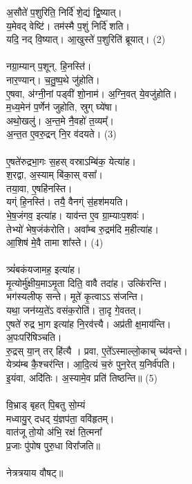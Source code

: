 अ॒सौते॑ प॒शुरिति॒ निर्दि॑ शे॒द्यं द्वि॒ष्यात्। \\
य॒मेवद् वेष्टि॑। तम॑स्मै प॒शुं निर्दि॑ शति। \\
यदि॒ नद् वि॒ष्यात्। आ॒खुस्ते॑ प॒शुरिति॑ ब्रूयात्। (2)\\
\\
नग्रा॒म्यान् प॒शून्, हि॒नस्ति॑। \\
नार॒ण्यान्। च॒तु॒ष्प॒थे जु॑होति।\\
ए॒षवा, अ॑ग्नी॒नां पड्वी॑ शो॒नाम॑। अ॒ग्नि॒वत् ये॒वजु॑होति। \\
म॒ध्य॒मेन॑ प॒र्णेन॑ जुहोति, स्रुग् घ्ये॑षा। \\
अथो॒खलु॑। अ॒न्त॒मे नै॒वहो॑ त॒व्यम्‌᳚। \\
अ॒न्त॒त ए॒वरु॒द्रन् नि॒र व॑दयते। (3)\\
\\
ए॒षते॑रुद्रभा॒गः स॒हस् वस्राऽम्बि॑क॒ येत्या॑ह। \\
श॒रद्वा, अ॒स्याम् बि॑का॒स् वसा᳚। \\
तया॒वा, ए॒षहि॑नस्ति।\\
यग्ं हि॒नस्ति॑। तयै॒ वैनग्ं स॒॑हश॑मयति। \\
भे॒ष॒जंगव॒ इत्या॑ह। याव॑न्त ए॒व ग्रा॒म्याःप॒शवः॑।\\
तेभ्यो॑ भेष॒जंक॑रोति। अवा᳚म्ब रु॒द्रम॑दि म॒हीत्या॑ह। \\
आ॒शिष॑ मे॒वै तामा शा᳚स्ते। (4)\\
\\
त्र्यं॑बकंयजामह॒ इत्या॑ह। \\
मृ॒त्योर्मु॑क्षीय॒माऽमृ॒ता दिति॒ वावै तदा॑ह। उत्कि॑रन्ति।\\
भग॑स्यलीफ् सन्ते। मूते॑ कृ॒त्वाऽऽ स॑जन्ति। \\
यथा॒ जन॑य्य॒ते॑ऽ वसंक॒रोति॑। ता॒दृ गे॒वतत्।\\
ए॒षते॑ रुद्र भा॒ग इत्या॑ह नि॒रव॑त्त्यै। अप्र॑ती क्ष॒माय॑न्ति। \\
अ॒पःपरि॑षिञ्चति। \\
रु॒द्रस् या॒न् तर् हि॑त्यै । प्रवा, ए॒ते᳚ऽस्माल्लो॒काच् च्य॑वन्ते। \\
येत्र्य॑म्ब कै॒श्चर॑न्ति। आ॒दि॒त्यं च॒रुं पुन॒रेत् य॒निर्व॑पति।\\
इ॒यंवा, अदि॑तिः। अ॒स्यामे॒व प्रति॑ तिष्ठन्ति॥ (5)\\
\\
वि॒भ्राड् बृहत् पि॒बतु सो॒म्यं \\
मध्वायु॒र् दधद् य॒॑ज्ञप॑ता॒ ववि॑हृतम्।\\
वात॑जू तो॒यो अ॑भि॒ रक्ष॑ ति॒त्मना᳚ \\
प्र॒जाः पु॑पोष पुरु॒धा विरा᳚जति॥\\
\\
नेत्रत्रयाय वौषट्॥\\
